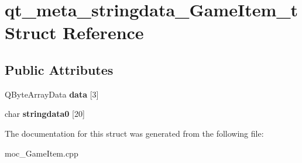 \hypertarget{structqt__meta__stringdata__GameItem__t}{}\section{qt\+\_\+meta\+\_\+stringdata\+\_\+\+Game\+Item\+\_\+t Struct Reference}
\label{structqt__meta__stringdata__GameItem__t}
\subsection*{Public Attributes}
\begin{DoxyCompactItemize}
\item 
Q\+Byte\+Array\+Data {\bfseries data} \mbox{[}3\mbox{]}\hypertarget{structqt__meta__stringdata__GameItem__t_a6d899d168e51660ea57dd55d93245086}{}\label{structqt__meta__stringdata__GameItem__t_a6d899d168e51660ea57dd55d93245086}

\item 
char {\bfseries stringdata0} \mbox{[}20\mbox{]}\hypertarget{structqt__meta__stringdata__GameItem__t_a5b537ade13ffa2d4c9c96082f4d60d2c}{}\label{structqt__meta__stringdata__GameItem__t_a5b537ade13ffa2d4c9c96082f4d60d2c}

\end{DoxyCompactItemize}


The documentation for this struct was generated from the following file\+:\begin{DoxyCompactItemize}
\item 
moc\+\_\+\+Game\+Item.\+cpp\end{DoxyCompactItemize}
